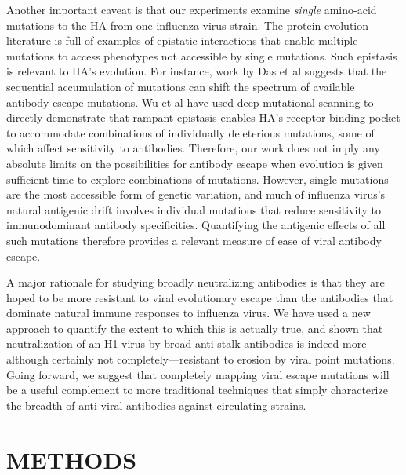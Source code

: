 \documentclass[11pt]{article}
\begin{document}
Another important caveat is that our experiments examine \emph{single} amino-acid mutations to the HA from one influenza virus strain.
The protein evolution literature is full of examples of epistatic interactions that enable multiple mutations to access phenotypes not accessible by single mutations\cite{gong2013stability,harms2014historical,starr2017alternative}.
Such epistasis is relevant to HA's evolution.  
For instance, work by Das et al\cite{das2013defining} suggests that the sequential accumulation of mutations can shift the spectrum of available antibody-escape mutations.
Wu et al\cite{wu2017diversity} have used deep mutational scanning to directly demonstrate that rampant epistasis enables HA's receptor-binding pocket to accommodate combinations of individually deleterious mutations, some of which affect sensitivity to antibodies.
Therefore, our work does not imply any absolute limits on the possibilities for antibody escape when evolution is given sufficient time to explore combinations of mutations.
However, single mutations are the most accessible form of genetic variation, and much of influenza virus's natural antigenic drift involves individual mutations that reduce sensitivity to immunodominant antibody specificities\cite{yewdell1979antigenic,webster1980determination,koel2013substitutions,chambers2015identification,petrie2016antibodies,neher2016prediction}.
Quantifying the antigenic effects of all such mutations therefore provides a relevant measure of ease of viral antibody escape. 

A major rationale for studying broadly neutralizing antibodies is that they are hoped to be more resistant to viral evolutionary escape than the antibodies that dominate natural immune responses to influenza virus\cite{krammer2015advances,corti2017tackling}.
We have used a new approach to quantify the extent to which this is actually true, and shown that neutralization of an H1 virus by broad anti-stalk antibodies is indeed more---although certainly not completely---resistant to erosion by viral point mutations.
Going forward, we suggest that completely mapping viral escape mutations will be a useful complement to more traditional techniques that simply characterize the breadth of anti-viral antibodies against circulating strains.

\clearpage
\small

\section*{METHODS}
\label{sec:methods}
\end{document}
